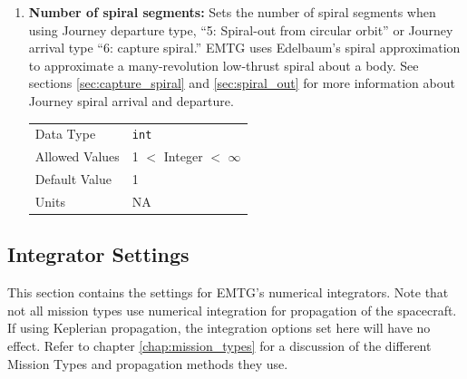     \begin{enumerate}

        \item \textbf{Number of spiral segments:} Sets the number of spiral segments when using Journey departure type, ``5: Spiral-out from circular orbit'' or Journey arrival type ``6: capture spiral.'' \ac{EMTG} uses Edelbaum's spiral approximation to approximate a many-revolution low-thrust spiral about a body. See sections \ref{sec:capture_spiral} and \ref{sec:spiral_out} for more information about Journey spiral arrival and departure.
        
            \begin{table}[H]
                \hspace{2cm}
                \begin{tabular}{ll}
                Data Type & \verb|int| \\
                Allowed Values & 1 $<$ Integer $<$ $\infty$ \\
                Default Value & 1 \\
                Units & NA
                \end{tabular}
            \end{table}
    
    \end{enumerate}

\subsection{Integrator Settings}

    This section contains the settings for \ac{EMTG}'s numerical integrators. Note that not all mission types use numerical integration for propagation of the spacecraft. If using Keplerian propagation, the integration options set here will have no effect. Refer to chapter \ref{chap:mission_types} for a discussion of the different Mission Types and propagation methods they use.

